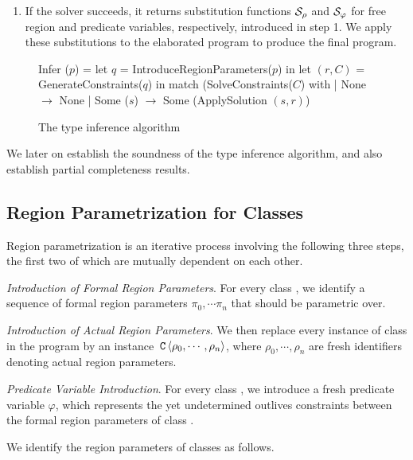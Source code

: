 \begin{enumerate}
 \item If the solver succeeds, it returns substitution functions $\mathcal{S}_\rho$ and
  $\mathcal{S}_\varphi$ for free region and predicate variables, respectively, introduced in
  step 1. We apply these substitutions to the elaborated program to produce the final program.
\end{enumerate}

\begin{figure}
\begin{numcodeml}
Infer ($p$) =
  let $q$ = IntroduceRegionParameters($p$) in
  let $(r,C)$ = GenerateConstraints($q$) in
  match (SolveConstraints($C$) with
  | None $\longrightarrow$ None
  | Some ($s$) $\longrightarrow$ Some (ApplySolution $(s,r)$)
\end{numcodeml}

\caption{The type inference algorithm}
\label{fig:type-inference-algo}
\end{figure}

We later on establish the soundness of the type inference algorithm, and also establish
partial completeness results.

\subsection{Region Parametrization for Classes}
\label{sec:fb-templatization}

Region parametrization is an iterative process involving the following three steps,
the first two of which are mutually dependent on each other.

\emph{Introduction of Formal Region Parameters}.
For every class , we identify a sequence of formal region parameters
$\pi_0, \cdots \pi_n$ that  should be parametric over.

\emph{Introduction of Actual Region Parameters}.
We then replace every instance of class  in the program by an instance
$\,{\tt C}\,\langle \rho_0, \cdots, \rho_n \rangle$, where $\rho_0, \cdots, \rho_n$
are fresh identifiers denoting actual region parameters.

\emph{Predicate Variable Introduction}. For every class , we introduce
a fresh predicate variable $\varphi$, which represents the yet undetermined
outlives constraints between the formal region parameters of class .

We identify the region parameters of classes as follows.

